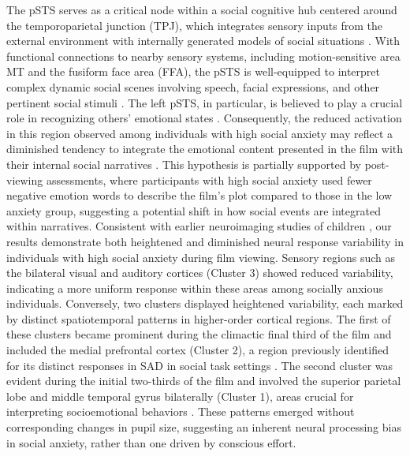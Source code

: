 The pSTS serves as a critical node within a social cognitive hub centered around the temporoparietal junction (TPJ), which integrates sensory inputs from the external environment with internally generated models of social situations \citep{patel2019}. With functional connections to nearby sensory systems, including motion-sensitive area MT and the fusiform face area (FFA), the pSTS is well-equipped to interpret complex dynamic social scenes involving speech, facial expressions, and other pertinent social stimuli \citep{dasgupta2017,ferreira2015,jabbi2015,lahnakoski2012,mottonen2006,shultz2015}. The left pSTS, in particular, is believed to play a crucial role in recognizing others' emotional states \citep{peelen2010,samson2004}. Consequently, the reduced activation in this region observed among individuals with high social anxiety may reflect a diminished tendency to integrate the emotional content presented in the film with their internal social narratives \citep{davey2016}. This hypothesis is partially supported by post-viewing assessments, where participants with high social anxiety used fewer negative emotion words to describe the film's plot compared to those in the low anxiety group, suggesting a potential shift in how social events are integrated within narratives.
Consistent with earlier neuroimaging studies of children \citep{camacho2023}, our results demonstrate both heightened and diminished neural response variability in individuals with high social anxiety during film viewing. Sensory regions such as the bilateral visual and auditory cortices (Cluster 3) showed reduced variability, indicating a more uniform response within these areas among socially anxious individuals. Conversely, two clusters displayed heightened variability, each marked by distinct spatiotemporal patterns in higher-order cortical regions. The first of these clusters became prominent during the climactic final third of the film and included the medial prefrontal cortex (Cluster 2), a region previously identified for its distinct responses in SAD in social task settings \citep{sripada2009,lorberbaum2004}. The second cluster was evident during the initial two-thirds of the film and involved the superior parietal lobe and middle temporal gyrus bilaterally (Cluster 1), areas crucial for interpreting socioemotional behaviors \citep{filimon2007,grosbras2006,lombardo2010,regenbogen2012}. These patterns emerged without corresponding changes in pupil size, suggesting an inherent neural processing bias in social anxiety, rather than one driven by conscious effort. 
